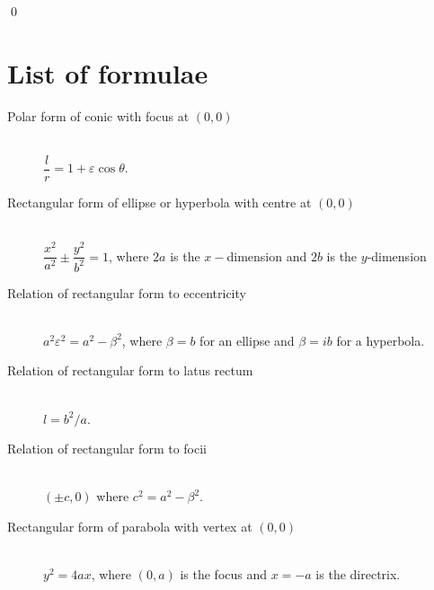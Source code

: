 \documentclass[a4paper,leqno,10pt]{article}
\theoremstyle{exercise}
\theoremstyle{plain}
\theoremstyle{definition}
\theoremstyle{remark}
\begin{document}
\qed

\appendix
{}[{\titlerule[0.8pt]}]
\section{List of formulae}

\begin{description}
  \item[Polar form of conic with focus at $ (0,0) $] \hfill \\
    $\dfrac{l}{r} = 1 + \varepsilon \cos \theta $.
  \item[Rectangular form of ellipse or hyperbola with centre at $ (0,0) $] \hfill \\
    $ \dfrac{x^2}{a^2} \pm \dfrac{y^2}{b^2} = 1 $, where $ 2a $ is the $ x-$dimension and $ 2b $ is the $ y$-dimension
  \item[Relation of rectangular form to eccentricity] \hfill \\
    $ a^2 \varepsilon^2 = a^2 - \beta^2 $,  where $ \beta = b $ for an ellipse and $ \beta = ib $ for a hyperbola.
  \item[Relation of rectangular form to latus rectum] \hfill \\
    $ l = b^2/a $.
  \item[Relation of rectangular form to focii] \hfill \\
    $ (\pm c, 0) $ where $ c^2 = a^2 - \beta^2 $.
  \item[Rectangular form of parabola with vertex at $ (0,0) $] \hfill \\
    $ y^2 = 4ax $, where $ (0,a) $ is the focus and $ x = -a $ is the directrix.
\end{description}
\end{document}
